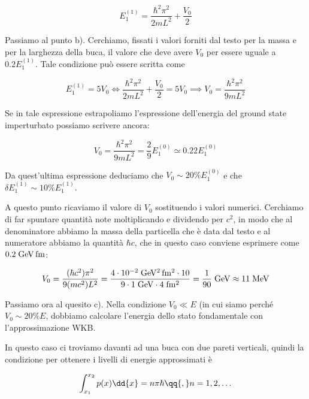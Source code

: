 \begin{soluzione}
   \begin{equation*}
      E_1^{(1)}
      =\frac{\hbar^2 \pi^2}{2mL^2} + \frac{V_0}{2}
   \end{equation*}
   
   Passiamo al punto b). Cerchiamo, fissati i valori forniti dal testo per la massa e per la larghezza della buca, il valore che deve avere $V_0$ per essere uguale a $0.2E_1^{(1)}$. Tale condizione può essere scritta come

   \begin{equation*}
      E_1^{(1)}=5V_0
      \iff
      \frac{\hbar^2 \pi^2}{2mL^2} + \frac{V_0}{2}=5V_0
      \implies
      V_0=\frac{\hbar^2 \pi^2}{9 m L^2}
   \end{equation*}

   Se in tale espressione estrapoliamo l'espressione dell'energia del ground state imperturbato possiamo scrivere ancora:

   \begin{equation*}
      V_0=\frac{\hbar^2 \pi^2}{9 m L^2}
      =\frac{2}{9} E_1^{(0)}
      \simeq 0.22 E_1^{(0)}
   \end{equation*}

   Da quest'ultima espressione deduciamo che $V_0 \sim 20\%E_1^{(0)}$ e che $\delta E_1^{(1)} \sim 10\%E_1^{(1)}$.

   A questo punto ricaviamo il valore di $V_0$ sostituendo i valori numerici. Cerchiamo di far spuntare quantità note moltiplicando e dividendo per $c^2$, in modo che al denominatore abbiamo la massa della particella che è data dal testo e al numeratore abbiamo la quantità $\hbar c$, che in questo caso conviene esprimere come $0.2 \; \rm GeV \, fm$:

   \begin{equation*}
      V_0
      =\frac{(\hbar c^2) \pi^2}{9 (mc^2) L^2}
      =\rm \frac{4 \cdot 10^{-2} \; GeV^2\,fm^2 \cdot 10}{9 \cdot 1 \; GeV \cdot 4 \; fm^2}
      =\frac{1}{90} \; GeV
      \approx 11 \; MeV
   \end{equation*}

   Passiamo ora al quesito c). Nella condizione $V_0 \ll E$ (in cui siamo perché $V_0 \sim 20\% E$, dobbiamo calcolare l'energia dello stato fondamentale con l'approssimazione WKB.
   
   In questo caso ci troviamo davanti ad una buca con due pareti verticali, quindi la condizione per ottenere i livelli di energie approssimati è
   
   \begin{equation*}
      \int_{x_1}^{x_2} p(x) \dd{x}=n\pi\hbar
      \qq{,}
      n=1,2,\ldots
   \end{equation*}


\end{soluzione}
